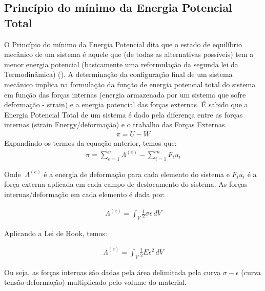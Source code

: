 \documentclass{article}
\begin{document}
\subsection{Princípio do mínimo da Energia Potencial \\ Total}
O Princípio do mínimo da Energia Potencial dita que o estado de equilíbrio mecânico de um sistema é aquele que (de todas as alternativas possíveis) tem a menor energia potencial (basicamente uma reformulação da segunda lei da Termodinâmica) (\cite{reddy2007introduction}). A determinação da configuração final de um sistema mecânico implica na formulação da função de energia potencial total do sistema em função das forças internas (energia armazenada por um sistema que sofre deformação - strain) e a energia potencial das forças externas. 
É sabido que a Energia Potencial Total de um sistema é dado pela diferença entre as forças internas (strain Energy/deformação) e o trabalho das Forças Externas.
\begin{equation}
\begin{split}
\pi = U - W
\end{split}
\end{equation}
Expandindo os termos da equação anterior, temos que:
\begin{equation}
\begin{split}
\pi = \sum_{e=1}^{n} \Lambda^{(e)} - \sum_{i=1}^{m} F_i u_i
\end{split}
\end{equation}

Onde $\ \Lambda^{(e)}$ é a energia de deformação para cada elemento do sistema e $F_i u_i$ é a força externa aplicada em cada campo de deslocamento do sistema.\newline
As forças internas/deformação em cada elemento é dada por:

\begin{equation}
\begin{split}
\Lambda^{(e)} = \int_{V} \frac{1}{2} \sigma \epsilon \,dV
\end{split}
\end{equation}

Aplicando a Lei de Hook, temos:

\begin{equation}
\begin{split}
\Lambda^{(e)} = \int_{V} \frac{1}{2} E \epsilon^2 \,dV
\end{split}
\end{equation}

Ou seja, as forças internas são dadas pela área delimitada pela curva $\sigma - \epsilon$ (curva tensão-deformação) multiplicado pelo volume do material.
\end{document}
